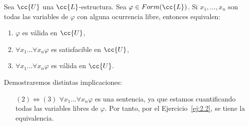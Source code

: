 \begin{ejercicio}\label{ej:2.4}
    Sea $\cc{U}$ una $\cc{L}$-estructura. Sea $\varphi \in Form(\cc{L})$. Si $x_1, \ldots, x_n$ son todas las variables de $\varphi$ con alguna ocurrencia libre, entonces equivalen:
    \begin{enumerate}
        \item $\varphi$ es válida en $\cc{U}$,
        \item $\forall x_1 \ldots \forall x_n \varphi$ es satisfacible en $\cc{U}$,
        \item $\forall x_1 \ldots \forall x_n \varphi$ es válida en $\cc{U}$.
    \end{enumerate}

    Demostraremos distintas implicaciones:
    \begin{itemize}
        \item[$(2)\Longleftrightarrow(3)$] $\forall x_1 \ldots \forall x_n \varphi$ es una sentencia, ya que estamos cuantificando todas las variables libres de $\varphi$. Por tanto, por el Ejercicio~\ref{ej:2.2}, se tiene la equivalencia.
    \end{itemize}

\end{ejercicio}

\begin{comment}
\setcounter{ejercicio}{4}
\begin{ejercicio}\label{ej:2.5}
    Sea $\cc{U}$ una $\cc{L}$-estructura. Sea $\varphi \in Form(\cc{L})$. Si $x_1, \ldots, x_n$ son todas las variables de $\varphi$ con alguna ocurrencia libre, entonces equivalen:
    \begin{enumerate}
        \item $\varphi$ es satisfacible en $\cc{U}$,
        \item $\exists x_1 \ldots \exists x_n \varphi$ es satisfacible en $\cc{U}$.
    \end{enumerate}
    ¿Es también cierta la equivalencia cambiando en el segundo apartado satisfacible por válida?
\end{ejercicio}
\end{comment}


